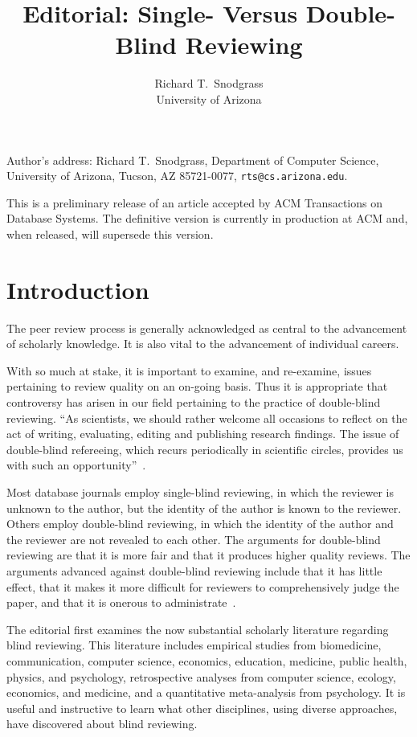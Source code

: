 \documentclass[acmtods,acmnow]{acmtrans2m}
\title{Editorial: Single- Versus Double-Blind Reviewing}
\author{Richard T.~Snodgrass\\University of Arizona
}
\begin{document}
\begin{bottomstuff}
Author's address: Richard T.\ Snodgrass, Department of Computer Science,
University of Arizona, Tucson, AZ 85721-0077, {\tt rts@cs.arizona.edu}.

This is a preliminary release of an article accepted by ACM
Transactions on Database Systems. The definitive version is currently
in production at ACM and, when released, will supersede this version.

\end{bottomstuff}

\maketitle

\section{Introduction}

The peer review process is generally acknowledged as central to the
advancement of scholarly knowledge. It is also vital to the
advancement of individual careers.

With so much at stake, it is important to examine, and re-examine, issues
pertaining to review quality on an on-going basis. Thus it is appropriate
that controversy has arisen in our field pertaining to the practice of
double-blind reviewing. ``As scientists, we should rather welcome
all occasions to reflect on the act of writing, evaluating, editing and
publishing research findings. The issue of double-blind refereeing, which
recurs periodically in scientific circles, provides us with such an
opportunity''~\cite[page 324]{genest93}.

Most database journals employ single-blind reviewing, in which the reviewer is
unknown to the author, but the identity of the author is known to the
reviewer. Others employ double-blind reviewing, in which the identity of the
author and the reviewer are not revealed to each other. The arguments for
double-blind reviewing are that it is more fair and that it produces higher
quality reviews.  The arguments advanced against double-blind reviewing
include that it has little effect, that it makes it more difficult for
reviewers to comprehensively judge the paper, and that it is onerous to
administrate~\cite{ceci84}.

The editorial first examines the now substantial scholarly
literature regarding blind reviewing. This literature includes empirical
studies from biomedicine, communication, computer science, economics,
education, medicine, public health, physics, and psychology, retrospective
analyses from computer science, ecology, economics, and medicine, and a
quantitative meta-analysis from psychology. It is useful and instructive to
learn what other disciplines, using diverse approaches, have discovered
about blind reviewing.
\end{document}
